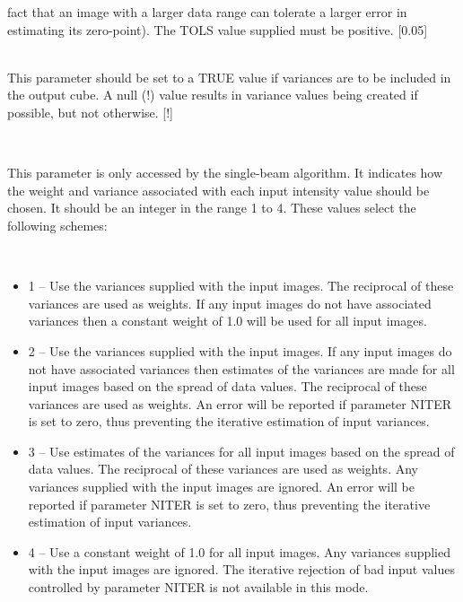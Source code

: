 \documentclass[twoside,11pt]{article}
\renewcommand{\_}{\texttt{\symbol{95}}}
\newcommand{\sstsubsection}[1]{ \item[{#1}] \mbox{} \\}
\newcommand{\sstitemlist}[1]{
  \mbox{} \\
  \vspace{-3.5ex}
  \begin{itemize}
     #1
  \end{itemize}
}
\newcommand{\sstitem}{\item}
\newcommand{\sstsubsection}[1]{\item[{#1}]}
\newcommand{\sstitemlist}[1]{
      \begin{itemize}
         #1
      \end{itemize}
      \\
   }
\newcommand{\sstitem}{\item}
\begin{document}
{{{         fact that an image with a larger data range can tolerate a larger
         error in estimating its zero-point). The TOLS value supplied must
         be positive. [0.05]
      }
      \sstsubsection{
         VARIANCE = \_LOGICAL (Read)
      }{
         This parameter should be set to a TRUE value if variances are to
         be included in the output cube. A null (!) value results in variance
         values being created if possible, but not otherwise. [!]
      }
      \sstsubsection{
         WEIGHTS = \_INTEGER (Read)
      }{
         This parameter is only accessed by the single-beam algorithm. It
         indicates how the weight and variance associated with each input
         intensity value should be chosen. It should be an integer in the
         range 1 to 4. These values select the following schemes:

         \sstitemlist{

            \sstitem
            1 -- Use the variances supplied with the input images. The
            reciprocal of these variances are used as weights. If any input
            images do not have associated variances then a constant weight of
            1.0 will be used for all input images.

            \sstitem
            2 -- Use the variances supplied with the input images. If any
            input images do not have associated variances then estimates of
            the variances are made for all input images based on the spread of
            data values. The reciprocal of these variances are used as weights.
            An error will be reported if parameter NITER is set to zero, thus
            preventing the iterative estimation of input variances.

            \sstitem
            3 -- Use estimates of the variances for all input images based
            on the spread of data values. The reciprocal of these variances
            are used as weights. Any variances supplied with the input images
            are ignored. An error will be reported if parameter NITER is set to
            zero, thus preventing the iterative estimation of input variances.

            \sstitem
            4 -- Use a constant weight of 1.0 for all input images. Any
            variances supplied with the input images are ignored. The
            iterative rejection of bad input values controlled by parameter
            NITER is not available in this mode.

}}}}
\end{document}
